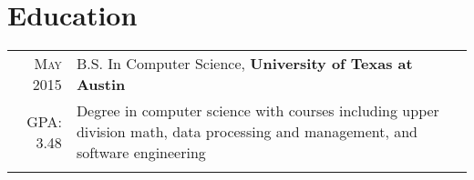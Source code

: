 \documentclass[a4paper,10pt]{article}
\begin{document}
\section{Education}
\begin{tabular}{rp{11cm}}
  \textsc{May 2015} & B.S. In Computer Science, \textbf{University of Texas at Austin}\\
  \textsc{GPA}: 3.48 &
  \footnotesize{
    Degree in computer science with courses including upper division math,
    data processing and management, and software engineering
  }
  \\\multicolumn{2}{c}{} \\

\end{tabular}

\end{document}
